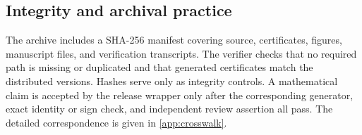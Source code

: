 \subsection{Integrity and archival practice}

The archive includes a SHA-256 manifest covering source, certificates, figures, manuscript files, and verification transcripts.  The verifier checks that no required path is missing or duplicated and that generated certificates match the distributed versions.  Hashes serve only as integrity controls.  A mathematical claim is accepted by the release wrapper only after the corresponding generator, exact identity or sign check, and independent review assertion all pass.  The detailed correspondence is given in \cref{app:crosswalk}.
